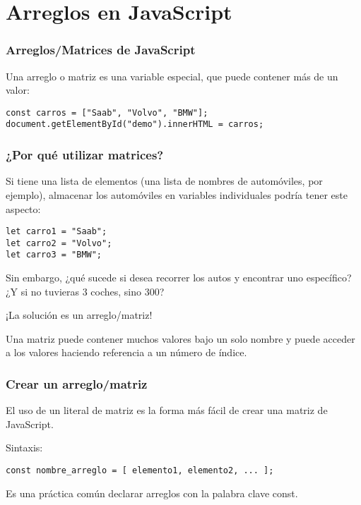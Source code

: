 
\section{Arreglos en JavaScript}

\begin{frame}[fragile]
  \frametitle{Arreglos/Matrices de JavaScript} 

  Una arreglo o matriz es una variable especial,
  que puede contener más de un valor:

  \vspace{\baselineskip}
  \begin{lstlisting}
const carros = ["Saab", "Volvo", "BMW"];
document.getElementById("demo").innerHTML = carros;
  \end{lstlisting}
\end{frame}

\begin{frame}[fragile]
  \frametitle{¿Por qué utilizar matrices?}

  Si tiene una lista de elementos (una lista de nombres de automóviles,
  por ejemplo), almacenar los automóviles en variables individuales podría
  tener este aspecto:

  \vspace{\baselineskip}
  \begin{lstlisting}
let carro1 = "Saab";
let carro2 = "Volvo";
let carro3 = "BMW"; 
  \end{lstlisting}

  \vspace{\baselineskip}
  Sin embargo, ¿qué sucede si desea recorrer los autos y encontrar uno
  específico? ¿Y si no tuvieras 3 coches, sino 300?

  \vspace{\baselineskip}
  ¡La solución es un arreglo/matriz!

  \vspace{\baselineskip}
  Una matriz puede contener muchos valores bajo un solo nombre y puede
  acceder a los valores haciendo referencia a un número de índice.
\end{frame}

\begin{frame}[fragile]
  \frametitle{Crear un arreglo/matriz}

  El uso de un literal de matriz es la forma más fácil de
  crear una matriz de JavaScript.

  \vspace{\baselineskip}
  Sintaxis:
  \begin{lstlisting}
const nombre_arreglo = [ elemento1, elemento2, ... ];
  \end{lstlisting}

  \begin{block}{}
    Es una práctica común declarar arreglos con la palabra clave const.
  \end{block}
\end{frame}

